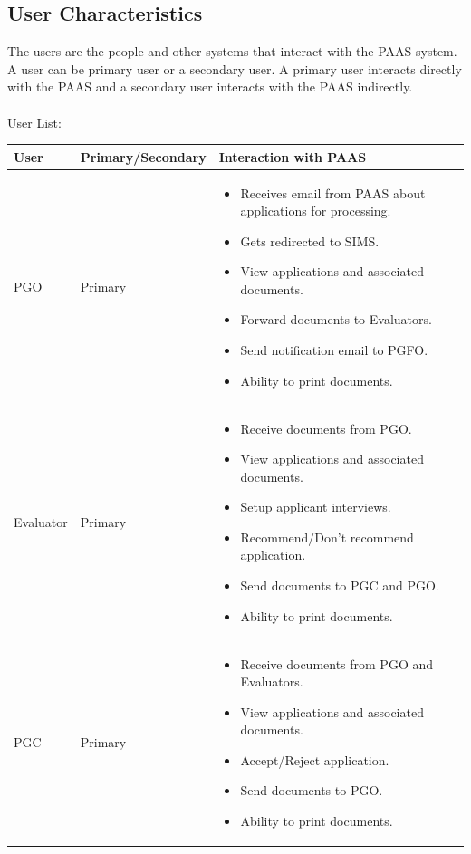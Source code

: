 \documentclass{article}
\begin{document}
\subsection{User Characteristics}
The users are the people and other systems that interact with the PAAS system. A user can be primary user or a secondary user. A primary user interacts directly with the PAAS and a secondary user interacts with the PAAS indirectly. \\ \\
User List: \\
\begin{tabular} {| m{1.5cm} | m{3.5cm} | m{9.5cm} |}
\hline
\textbf{User} & \textbf{Primary/Secondary} & \textbf{Interaction with PAAS} \\
\hline
PGO & Primary & \begin{itemize} \itemsep0em
\item Receives email from PAAS about applications for processing.
\item Gets redirected to SIMS.
\item View applications and associated documents.
\item Forward documents to Evaluators.
\item Send notification email to PGFO.
\item Ability to print documents. 
\end{itemize} \\
\hline
Evaluator & Primary & \begin{itemize} \itemsep0em
\item Receive documents from PGO.
\item View applications and associated documents.
\item Setup applicant interviews.
\item Recommend/Don't recommend application.
\item Send documents to PGC and PGO.
\item Ability to print documents.
\end{itemize} \\
\hline
PGC & Primary & \begin{itemize} \itemsep0em
\item Receive documents from PGO and Evaluators.
\item View applications and associated documents.
\item Accept/Reject application.
\item Send documents to PGO.
\item Ability to print documents.

\end{itemize}
\end{tabular}
\end{document}
